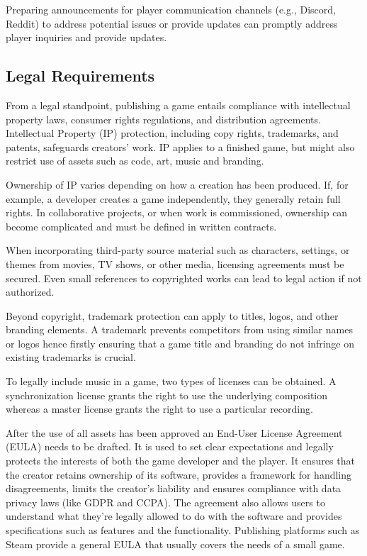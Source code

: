 Preparing announcements for player communication channels (e.g., Discord, Reddit) to address potential issues or provide updates can promptly address player inquiries and provide updates.\cite{palmer_planning-launch, edgegap_pre-launch-list}

\subsection{Legal Requirements}
From a legal standpoint, publishing a game entails compliance with intellectual property laws, consumer rights regulations, and distribution agreements. Intellectual Property (IP) protection, including copy rights, trademarks, and patents, safeguards creators’ work. IP applies to a finished game, but might also restrict use of assets such as code, art, music and branding.\cite{jd-supra_ip}

Ownership of IP varies depending on how a creation has been produced. If, for example, a developer creates a game independently, they generally retain full rights. In collaborative projects, or when work is commissioned, ownership can become complicated and must be defined in written contracts.\cite{silva_guide-to-release, jd-supra_ip}

When incorporating third-party source material such as characters, settings, or themes from movies, TV shows, or other media, licensing agreements must be secured. Even small references to copyrighted works can lead to legal action if not authorized.\cite{silva_guide-to-release, jd-supra_ip}

Beyond copyright, trademark protection can apply to titles, logos, and other branding elements. A trademark prevents competitors from using similar names or logos hence firstly ensuring that a game title and branding do not infringe on existing trademarks is crucial.\cite{dragon_copyright}

To legally include music in a game, two types of licenses can be obtained. A synchronization license grants the right to use the underlying composition whereas a master license grants the right to use a particular recording.\cite{iconcollective_music-license}

After the use of all assets has been approved an End-User License Agreement (EULA) needs to be drafted.\cite{silva_guide-to-release} It is used to set clear expectations and legally protects the interests of both the game developer and the player. It ensures that the creator retains ownership of its software, provides a framework for handling disagreements, limits the creator’s liability and ensures compliance with data privacy laws (like GDPR and CCPA). The agreement also allows users to understand what they're legally allowed to do with the software and provides specifications such as features and the functionality. Publishing platforms such as Steam provide a general EULA that usually covers the needs of a small game.\cite{docupilot_eula, steam_content-survey}

